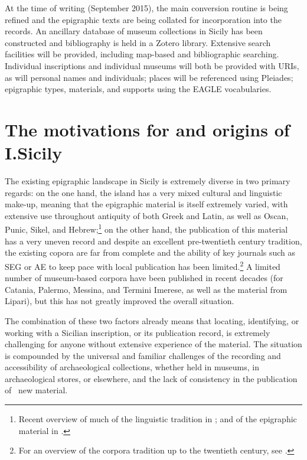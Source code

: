 \documentclass[amsthm,ebook]{saparticle}
\begin{document}
At the time of writing (September 2015), the main conversion routine is being refined and the epigraphic texts are being
collated for incorporation into the records. An ancillary database of museum collections in Sicily has been constructed
and bibliography is held in a Zotero library. Extensive search facilities will be provided, including map-based and
bibliographic searching. Individual inscriptions and individual museums will both be provided with URIs, as will
personal names and individuals; places will be referenced using Pleiades; epigraphic types, materials, and supports
using the EAGLE vocabularies.

\section{The motivations for and origins of I.Sicily}
\noindent The existing epigraphic landscape in Sicily is extremely diverse in two primary regards: on the one hand, the island has
a very mixed cultural and linguistic make-up, meaning that the epigraphic material is itself extremely varied, with
extensive use throughout antiquity of both Greek and Latin, as well as Oscan, Punic, Sikel, and Hebrew;\footnote{
Recent overview of much of the linguistic tradition in \citet{tribulato_language_2012}; and of the epigraphic material in \citet{gulletta_sicilia_1999}.} on the other hand, the publication of this material has a very uneven record and despite an excellent
pre-twentieth century tradition, the existing copora are far from complete and the ability of key journals such as SEG
or AE to keep pace with local publication has been limited.\footnote{ For an overview of the corpora tradition up to
the twentieth century, see \citet{de_vido_corpora_1999}.} A limited number of museum-based corpora have been published in recent
decades (for Catania, Palermo, Messina, and Termini Imerese, as well as the material from Lipari), but this has not
greatly improved the overall situation.

The combination of these two factors already means that locating, identifying, or working with a Sicilian inscription,
or its publication record, is extremely challenging for anyone without extensive experience of the material. The
situation is compounded by the universal and familiar challenges of the recording and accessibility of archaeological
collections, whether held in museums, in archaeological stores, or elsewhere, and the lack of consistency in the
publication of \ new material.
\end{document}
